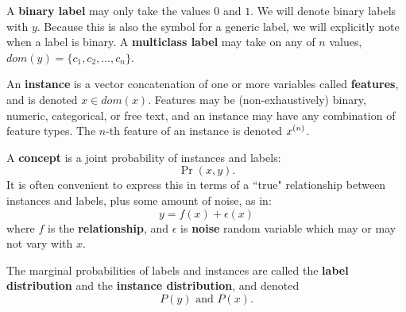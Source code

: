 A {\bf binary label} may only take the values $0$ and $1$. We will denote binary labels with $y$. Because this is also the symbol for a generic label, we will explicitly note when a label is binary. A {\bf multiclass label} may take on any of $n$ values, $dom(y)=\{c_1,c_2,\dots,c_n\}$. %

An {\bf instance} is a vector concatenation of one or more variables called {\bf features}, and is denoted $x\in dom(x)$. Features may be (non-exhaustively) binary, numeric, categorical, or free text, and an instance may have any combination of feature types. The $n$-th feature of an instance is denoted $x^{(n)}$.

A {\bf concept} is a joint probability of instances and labels:
\begin{equation}
    \Pr(x,y).
\end{equation}
It is often convenient to express this in terms of a ``true" relationship between instances and labels, plus some amount of noise, as in:
\begin{equation}
    y = f(x) + \epsilon(x)
\end{equation}
where $f$ is the {\bf relationship}, and $\epsilon$ is {\bf noise} random variable which may or may not vary with $x$. 

The marginal probabilities of labels and instances are called the {\bf label distribution} and the {\bf instance distribution}, and denoted
\begin{equation}
    P(y) \text{ and } P(x).
\end{equation}
 
